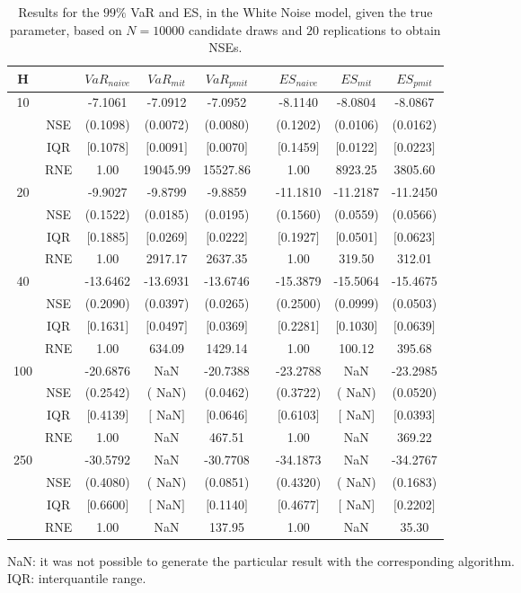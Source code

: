 \footnotesize{  
{ \renewcommand{\arraystretch}{1.3} 
\begin{table}[h] 
\centering 
\caption{Results for the $99\%$ VaR and ES, in the White Noise model, given the true parameter, based on $N=10000$ candidate draws and $20$ replications to obtain NSEs.} 
\label{tab:res_algos_WN_ML} 
\begin{tabular}{ccccccccc}  
 H & & $VaR_{naive}$ & $VaR_{mit}$ & $VaR_{pmit}$ &  & $ES_{naive}$ & $ES_{mit}$ & $ES_{pmit}$ \\ \hline 
10 & & -7.1061 & -7.0912 & -7.0952 & & -8.1140 & -8.0804 & -8.0867  \\ 
  & NSE & (0.1098) & (0.0072) & (0.0080) & & (0.1202) & (0.0106) & (0.0162)   \\ 
 & IQR & $[$0.1078$]$ & $[$0.0091$]$ & $[$0.0070$]$ & & $[$0.1459$]$ & $[$0.0122$]$ & $[$0.0223$]$  \\  
  & RNE &   1.00 & 19045.99 & 15527.86 & &   1.00 & 8923.25 & 3805.60   \\ [1ex] 
20 & & -9.9027 & -9.8799 & -9.8859 & & -11.1810 & -11.2187 & -11.2450  \\ 
  & NSE & (0.1522) & (0.0185) & (0.0195) & & (0.1560) & (0.0559) & (0.0566)   \\ 
 & IQR & $[$0.1885$]$ & $[$0.0269$]$ & $[$0.0222$]$ & & $[$0.1927$]$ & $[$0.0501$]$ & $[$0.0623$]$  \\  
  & RNE &   1.00 & 2917.17 & 2637.35 & &   1.00 & 319.50 & 312.01   \\ [1ex] 
40 & & -13.6462 & -13.6931 & -13.6746 & & -15.3879 & -15.5064 & -15.4675  \\ 
  & NSE & (0.2090) & (0.0397) & (0.0265) & & (0.2500) & (0.0999) & (0.0503)   \\ 
 & IQR & $[$0.1631$]$ & $[$0.0497$]$ & $[$0.0369$]$ & & $[$0.2281$]$ & $[$0.1030$]$ & $[$0.0639$]$  \\  
  & RNE &   1.00 & 634.09 & 1429.14 & &   1.00 & 100.12 & 395.68   \\ [1ex] 
100 & & -20.6876 &    NaN & -20.7388 & & -23.2788 &    NaN & -23.2985  \\ 
  & NSE & (0.2542) & (   NaN) & (0.0462) & & (0.3722) & (   NaN) & (0.0520)   \\ 
 & IQR & $[$0.4139$]$ & $[$   NaN$]$ & $[$0.0646$]$ & & $[$0.6103$]$ & $[$   NaN$]$ & $[$0.0393$]$  \\  
  & RNE &   1.00 &    NaN & 467.51 & &   1.00 &    NaN & 369.22   \\ [1ex] 
250 & & -30.5792 &    NaN & -30.7708 & & -34.1873 &    NaN & -34.2767  \\ 
  & NSE & (0.4080) & (   NaN) & (0.0851) & & (0.4320) & (   NaN) & (0.1683)   \\ 
 & IQR & $[$0.6600$]$ & $[$   NaN$]$ & $[$0.1140$]$ & & $[$0.4677$]$ & $[$   NaN$]$ & $[$0.2202$]$  \\  
  & RNE &   1.00 &    NaN & 137.95 & &   1.00 &    NaN &  35.30   \\ [1ex] 
\hline 
\end{tabular} 
\raggedright 

\vspace{5pt}\footnotesize{NaN: it was not possible to generate the particular result with the corresponding algorithm.} \\ 
\vspace{5pt}\footnotesize{IQR: interquantile range.} 
\end{table} 
} 
} 
